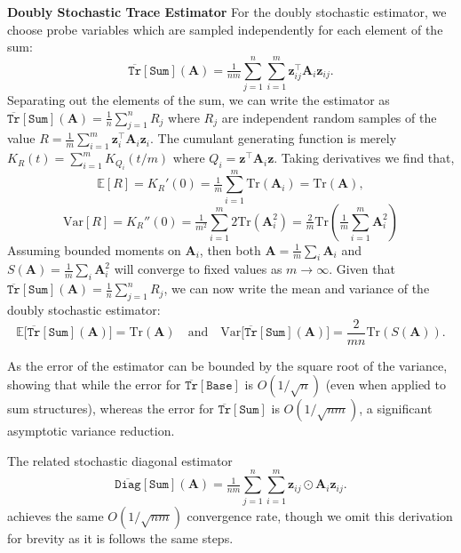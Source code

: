 \documentclass{article}
\newcommand{\mbf}[1]{{\boldsymbol{\mathbf{#1}}}}
\renewcommand{\bm}{\mbf}
\begin{document}
\textbf{Doubly Stochastic Trace Estimator} \quad
For the doubly stochastic estimator, we choose probe variables which are sampled independently for each element of the sum:
\begin{equation}
  \overline{\texttt{Tr}}[\texttt{Sum}](\bm A) = \tfrac{1}{nm}\sum_{j=1}^n \sum_{i=1}^m \bm{z}^{\intercal}_{ij} \bm A_i \bm{z}_{ij}.
\end{equation}
Separating out the elements of the sum, we can write the estimator as $
    \overline{\texttt{Tr}}[\texttt{Sum}](\bm A) = \tfrac{1}{n}\sum_{j=1}^n R_j$
    where $R_j$ are independent random samples of the value $R = \tfrac{1}{m} \sum_{i=1}^m \bm{z}_i^{\intercal} \bm A_i \bm{z}_i$.
    The cumulant generating function is merely $K_R(t) = \sum_{i=1}^m K_{Q_i}(t/m)$ where $Q_i = \bm{z}^{\intercal} \bm A_i \bm{z}$.
    Taking derivatives we find that,
    \begin{equation}
        \mathbb{E}[R] = K_R'(0) = \tfrac{1}{m}\sum_{i=1}^m \mathrm{Tr}(\bm A_i) =  \mathrm{Tr}(\bm A),
    \end{equation}
    \begin{equation}
        \textrm{Var}[R] = K_R''(0) = \tfrac{1}{m^2}\sum_{i=1}^m 2\mathrm{Tr}(\bm A_i^2) =\tfrac{2}{m}\mathrm{Tr}(\tfrac{1}{m}\sum_{i=1}^m \bm A_i^2)
    \end{equation}
Assuming bounded moments on $\bm A_i$, then both $\bm A = \tfrac{1}{m}\sum_i \bm A_i$ and $S(\bm A) = \tfrac{1}{m}\sum_i \bm A_i^2$ will converge to fixed values as $m \rightarrow \infty$.
Given that $\overline{\texttt{Tr}}[\texttt{Sum}](\bm A) = \tfrac{1}{n}\sum_{j=1}^n R_j$, we can now write the mean and variance of the doubly stochastic estimator:
\begin{equation}
    \mathbb{E}\big[\overline{\texttt{Tr}}[\texttt{Sum}](\bm A)\big] = \mathrm{Tr}(\bm A) \quad \mathrm{and}\quad \mathrm{Var}\big[\overline{\texttt{Tr}}[\texttt{Sum}](\bm A)\big] = \frac{2}{mn} \mathrm{Tr}(S(\bm A)).
\end{equation}

As the error of the estimator can be bounded by the square root of the variance,
showing that while the error for $\overline{\texttt{Tr}}[\texttt{Base}]$ is $O(1/\sqrt{n})$ (even when applied to sum structures),
whereas the error for $\overline{\texttt{Tr}}[\texttt{Sum}]$ is $O(1/\sqrt{nm})$, a significant asymptotic variance reduction.

The related stochastic diagonal estimator
\begin{equation}
  \overline{\texttt{Diag}}[\texttt{Sum}](\bm A) = \tfrac{1}{nm}\sum_{j=1}^n \sum_{i=1}^m \bm{z}_{ij}\odot \bm A_i \bm{z}_{ij}.
\end{equation}
achieves the same $O(1/\sqrt{nm})$ convergence rate, though we omit this derivation for brevity as it is follows the same steps.
\end{document}
